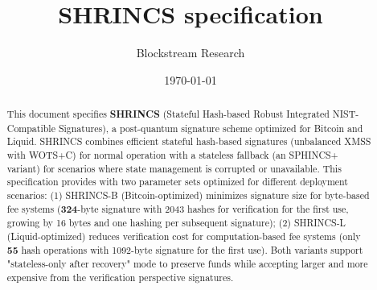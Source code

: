 \documentclass[10pt, a4paper]{article}
\title{SHRINCS specification}
\author{Blockstream Research}
\date{\today}
\begin{document}
\maketitle

\begin{abstract}
  This document specifies \textbf{SHRINCS} (Stateful Hash-based Robust Integrated NIST-Compatible Signatures), a post-quantum signature scheme optimized for Bitcoin and Liquid. SHRINCS combines efficient stateful hash-based signatures (unbalanced XMSS with WOTS+C) for normal operation with a stateless fallback (an SPHINCS+ variant) for scenarios where state management is corrupted or unavailable. This specification provides with two parameter sets optimized for different deployment scenarios: (1) SHRINCS-B (Bitcoin-optimized) minimizes signature size for byte-based fee systems (\textbf{324}-byte signature with 2043 hashes for verification for the first use, growing by 16 bytes and one hashing per subsequent signature); (2) SHRINCS-L (Liquid-optimized) reduces verification cost for computation-based fee systems (only \textbf{55} hash operations with 1092-byte signature for the first use). Both variants support "stateless-only after recovery" mode to preserve funds while accepting larger and more expensive from the verification perspective signatures. 
\end{abstract}

\tableofcontents

\newpage























\printbibliography{}

\appendix




\end{document}
